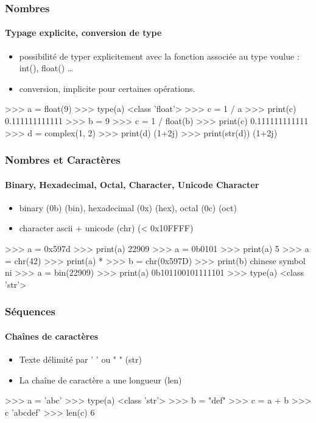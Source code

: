 \begin{frame}[fragile]
\frametitle{Nombres}
\framesubtitle{Typage explicite, conversion de type}
\begin{itemize}
 \item possibilité de typer explicitement avec la fonction associée au type voulue : int(), float() \dots
 \item conversion, implicite pour certaines opérations. 
\end{itemize}
\begin{pythonConsole}
>>> a = float(9)
>>> type(a)
<class 'float'>
>>> c = 1 / a
>>> print(c)
0.111111111111
>>> b = 9
>>> c = 1 / float(b)
>>> print(c)
0.111111111111
>>> d = complex(1, 2)
>>> print(d)
(1+2j)
>>> print(str(d))
(1+2j)
\end{pythonConsole}
\end{frame}
\begin{frame}[fragile]
\frametitle{Nombres et Caractères}
\framesubtitle{Binary, Hexadecimal, Octal, Character, Unicode Character}
\begin{itemize}
 \item binary (0b) (bin), hexadecimal (0x) (hex), octal (0c) (oct) 
 \item character ascii + unicode (chr) (< 0x10FFFF) 
\end{itemize}
\begin{pythonConsole}
>>> a = 0x597d
>>> print(a)
22909
>>> a = 0b0101
>>> print(a)
5
>>> a = chr(42)
>>> print(a)
*
>>> b = chr(0x597D)
>>> print(b)
chinese symbol ni
>>> a = bin(22909)
>>> print(a)
0b101100101111101
>>> type(a)
<class 'str'>
\end{pythonConsole}
\end{frame}
\begin{frame}[fragile]
\frametitle{Séquences}
\framesubtitle{Chaînes de caractères}
\begin{itemize}
 \item Texte délimité par ' ' ou " " (str) 
 \item La chaîne de caractère a une longueur (len)
\end{itemize}
\begin{pythonConsole}
>>> a = 'abc'
>>> type(a)
<class 'str'>
>>> b = "def"
>>> c = a + b
>>> c
'abcdef'
>>> len(c)
6
\end{pythonConsole}
\end{frame}
